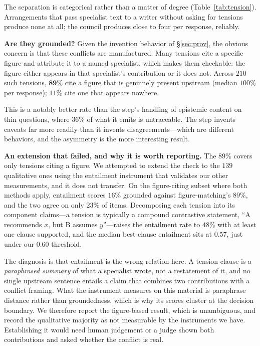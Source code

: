 \documentclass[11pt]{article}
\begin{document}
The separation is categorical rather than a matter of degree
(Table~\ref{tab:tension}). Arrangements that pass specialist text to a writer
without asking for tensions produce none at all; the council produces close to
four per response, reliably.

\textbf{Are they grounded?} Given the invention behavior of
\S\ref{sec:prov}, the obvious concern is that these conflicts are
manufactured. Many tensions cite a specific figure and attribute it to a named
specialist, which makes them checkable: the figure either appears in that
specialist's contribution or it does not. Across $210$ such tensions,
$\mathbf{89\%}$ cite a figure that is genuinely present upstream (median
$100\%$ per response); $11\%$ cite one that appears nowhere.

This is a notably better rate than the step's handling of epistemic content on
thin questions, where $36\%$ of what it emits is untraceable. The step
invents caveats far more readily than it invents disagreements---which are
different behaviors, and the asymmetry is the more interesting result.

\textbf{An extension that failed, and why it is worth reporting.} The $89\%$
covers only tensions citing a figure. We attempted to extend the check to the
$139$ qualitative ones using the entailment instrument that validates our
other measurements, and it does not transfer. On the figure-citing subset
where both methods apply, entailment scores $16\%$ grounded against
figure-matching's $89\%$, and the two agree on only $23\%$ of items.
Decomposing each tension into its component claims---a tension is typically a
compound contrastive statement, ``A recommends $x$, but B assumes
$y$''---raises the entailment rate to $48\%$ with at least one clause
supported, and the median best-clause entailment sits at $0.57$, just under
our $0.60$ threshold.

The diagnosis is that entailment is the wrong relation here. A tension clause
is a \emph{paraphrased summary} of what a specialist wrote, not a restatement
of it, and no single upstream sentence entails a claim that combines two
contributions with a conflict framing. What the instrument measures on this
material is paraphrase distance rather than groundedness, which is why its
scores cluster at the decision boundary. We therefore report the figure-based
result, which is unambiguous, and record the qualitative majority as not
measurable by the instruments we have. Establishing it would need human
judgement or a judge shown both contributions and asked whether the conflict
is real.
\end{document}
